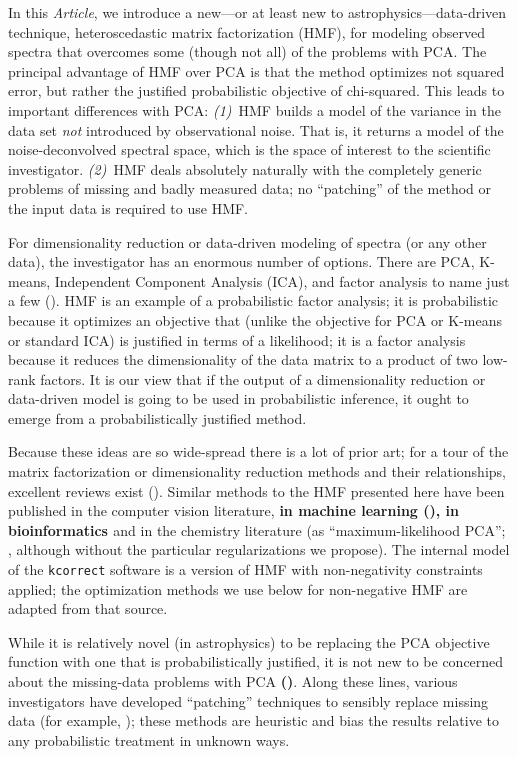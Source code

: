 \documentclass[12pt,preprint]{aastex}
\newcommand{\documentname}{\textsl{Article}}
\begin{document}
In this \documentname, we introduce a new---or at least new to
astrophysics---data-driven technique, heteroscedastic matrix
factorization (HMF), for modeling observed spectra that overcomes some
(though not all) of the problems with PCA.  The principal advantage of
HMF over PCA is that the method optimizes not squared error, but
rather the justified probabilistic objective of chi-squared.  This
leads to important differences with PCA: \textsl{(1)}~HMF builds a
model of the variance in the data set \emph{not} introduced by
observational noise.  That is, it returns a model of the
noise-deconvolved spectral space, which is the space of interest to
the scientific investigator.  \textsl{(2)}~HMF deals absolutely
naturally with the completely generic problems of missing and badly
measured data; no ``patching'' of the method or the input data is
required to use HMF.

For dimensionality reduction or data-driven modeling of spectra (or
any other data), the investigator has an enormous number of options.
There are PCA, K-means, Independent Component Analysis (ICA), 
and factor analysis to name just a few (\citealt{rz}).
HMF is an example of a probabilistic factor analysis;
it is probabilistic because it optimizes an objective that
(unlike the objective for PCA or K-means or standard ICA) is
justified in terms of a likelihood; it is a factor analysis because it
reduces the dimensionality of the data matrix to a product of two
low-rank factors.  It is our view that if the output of a
dimensionality reduction or data-driven model is going to be used in
probabilistic inference, it ought to emerge from a probabilistically
justified method.

Because these ideas are so wide-spread there is a lot of prior art;
for a tour of the matrix factorization or dimensionality reduction
methods and their relationships, excellent reviews exist
(\citealt{rz}).
Similar methods to the HMF presented here have been
published in the computer vision literature, \textbf{in machine 
learning (\citealt{wilsona, wilsonb}), in bioinformatics \citep{bio}} and in
the chemistry literature (as ``maximum-likelihood PCA'';
\citealt{mlpca}, although without the particular regularizations we
propose).  The internal model of the \texttt{kcorrect} software
\citep{blanton} is a version of HMF with non-negativity constraints
applied; the optimization methods we use below for non-negative HMF
are adapted from that source.

While it is relatively novel (in astrophysics) to be replacing the PCA
objective function with one that is probabilistically justified, it is
not new to be concerned about the missing-data problems with PCA \textbf{(\citealt{connollya, budavarirobust})}.
Along these lines, various investigators have developed ``patching''
techniques to sensibly replace missing data (for example,
\citealt{eishogg, wild, budavarirobust, borosona}); these methods are
heuristic and bias the results relative to any probabilistic treatment
in unknown ways.
\end{document}
